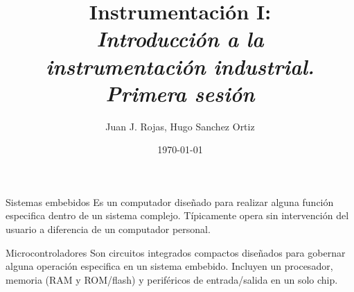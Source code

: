 \documentclass[aspectratio=169]{beamer}
\title{Instrumentación I: \\ \emph{Introducción a la }\\ \emph{instrumentación industrial.} \\ \emph{Primera sesión}}
\author{
    Juan J. Rojas, Hugo Sanchez Ortiz
}
\institute{Instituto Tecnológico de Costa Rica}
\date{\today}
\begin{document}

\maketitle

\newcommand{\blackandwhite}{white} %

\begin{frame}[t]{Sistemas embebidos}
Es un computador diseñado para realizar alguna función especifica dentro de un sistema complejo. Típicamente opera sin intervención del usuario a diferencia de un computador personal.  

\end{frame}

\begin{frame}[t]{Microcontroladores}
Son circuitos integrados compactos diseñados para gobernar alguna operación especifica en un sistema embebido. Incluyen un procesador, memoria (RAM y ROM/flash) y periféricos de entrada/salida en un solo chip.

\end{frame}
\end{document}

